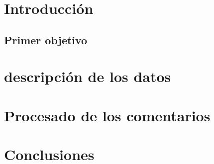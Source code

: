 \chapter{Introducción}



\section{Primer objetivo}
 

\chapter{descripción de los datos}

\chapter{Procesado de los comentarios}


\chapter{Conclusiones}

